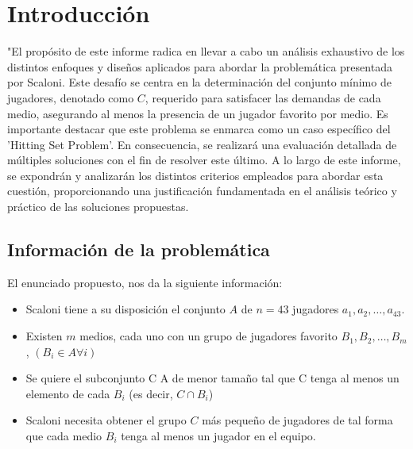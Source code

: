 \section{Introducción}

"El propósito de este informe radica en llevar a cabo un análisis exhaustivo de los 
distintos enfoques y diseños aplicados para abordar la problemática presentada por 
Scaloni. Este desafío se centra en la determinación del conjunto mínimo de jugadores,
denotado como $C$, requerido para satisfacer las demandas de cada medio, asegurando al 
menos la presencia de un jugador favorito por medio. Es importante destacar que este 
problema se enmarca como un caso específico del 'Hitting Set Problem'. En consecuencia, 
se realizará una evaluación detallada de múltiples soluciones con el fin de resolver este
último. A lo largo de este informe, se expondrán y analizarán los distintos criterios 
empleados para abordar esta cuestión, proporcionando una justificación fundamentada 
en el análisis teórico y práctico de las soluciones propuestas.

\subsection{Información de la problemática}

El enunciado propuesto, nos da la siguiente información:

\begin{itemize}

    \item Scaloni tiene a su disposición el conjunto $A$ de $n=43$ jugadores $a_1, a_2, \dots, a_{43}$.
    \item Existen $m$ medios, cada uno con un grupo de jugadores favorito $B_1, B_2, \dots, B_m$, 
    $(B_i \in A \forall i)$
    \item Se quiere el subconjunto C \in A de menor tamaño tal que C tenga al menos un elemento de cada $B_i$ (es decir, $C \cap B_i$) 
    \item Scaloni necesita obtener el grupo $C$ más pequeño de jugadores de tal forma que cada medio $B_i$ tenga al menos un jugador en el equipo.

\end{itemize}
